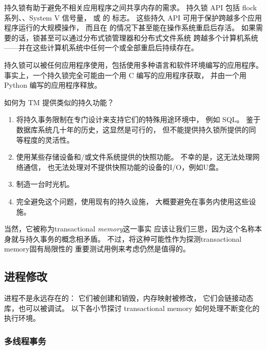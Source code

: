 \QuickQuizEnd

持久锁有助于避免不相关应用程序之间共享内存的需求。
持久锁 API 包括 flock 系列、、System V 信号量，
或  的  标志。
这些持久 API 可用于保护跨越多个应用程序运行的大规模操作，
而且在  的情况下甚至能在操作系统重启后存活。
如果需要的话，锁甚至可以通过分布式锁管理器和分布式文件系统
跨越多个计算机系统——并在这些计算机系统中任何一个或全部重启后持续存在。

持久锁可以被任何应用程序使用，包括使用多种语言和软件环境编写的应用程序。
事实上，一个持久锁完全可能由一个用 C 编写的应用程序获取，
并由一个用 Python 编写的应用程序释放。

如何为 TM 提供类似的持久功能？

\begin{enumerate}
\item	将持久事务限制在专门设计来支持它们的特殊用途环境中，
	例如 SQL。
	鉴于数据库系统几十年的历史，这显然是可行的，
	但不能提供持久锁所提供的同等程度的灵活性。
\item	使用某些存储设备和/或文件系统提供的快照功能。
	不幸的是，这无法处理网络通信，
	也无法处理对不提供快照功能的设备的I/O，例如U盘。
\item	制造一台时光机。
\item	完全避免这个问题，使用现有的持久设施，
	大概要避免在事务内使用这些设施。
\end{enumerate}

当然，它被称为transactional \emph{memory}这一事实
应该让我们三思，因为这个名称本身就与持久事务的概念相矛盾。
不过，将这种可能性作为探测transactional memory固有局限性的
重要测试用例来考虑仍然是值得的。

\subsection{进程修改}
\label{sec:future:Process Modification}

进程不是永远存在的：
它们被创建和销毁，内存映射被修改，
它们会链接动态库，也可以被调试。
以下各小节探讨 transactional memory 如何处理不断变化的执行环境。

\subsubsection{多线程事务}
\label{sec:future:Multithreaded Transactions}

